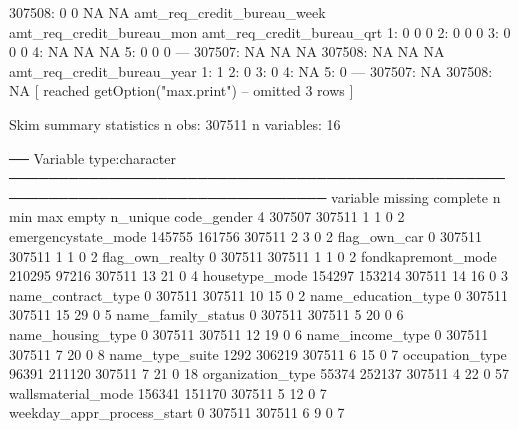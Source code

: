\documentclass[a4paper]{article}
\begin{document}
\begin{Schunk}
\begin{Soutput}
307508:                0                0                         NA                        NA
        amt_req_credit_bureau_week amt_req_credit_bureau_mon amt_req_credit_bureau_qrt
     1:                          0                         0                         0
     2:                          0                         0                         0
     3:                          0                         0                         0
     4:                         NA                        NA                        NA
     5:                          0                         0                         0
    ---                                                                               
307507:                         NA                        NA                        NA
307508:                         NA                        NA                        NA
        amt_req_credit_bureau_year
     1:                          1
     2:                          0
     3:                          0
     4:                         NA
     5:                          0
    ---                           
307507:                         NA
307508:                         NA
 [ reached getOption("max.print") -- omitted 3 rows ]
\end{Soutput}
\begin{Soutput}
Skim summary statistics
 n obs: 307511 
 n variables: 16 

── Variable type:character ──────────────────────────────────────────────────────────────────────────────────
                   variable missing complete      n min max empty n_unique
                code_gender       4   307507 307511   1   1     0        2
        emergencystate_mode  145755   161756 307511   2   3     0        2
               flag_own_car       0   307511 307511   1   1     0        2
            flag_own_realty       0   307511 307511   1   1     0        2
         fondkapremont_mode  210295    97216 307511  13  21     0        4
             housetype_mode  154297   153214 307511  14  16     0        3
         name_contract_type       0   307511 307511  10  15     0        2
        name_education_type       0   307511 307511  15  29     0        5
         name_family_status       0   307511 307511   5  20     0        6
          name_housing_type       0   307511 307511  12  19     0        6
           name_income_type       0   307511 307511   7  20     0        8
            name_type_suite    1292   306219 307511   6  15     0        7
            occupation_type   96391   211120 307511   7  21     0       18
          organization_type   55374   252137 307511   4  22     0       57
         wallsmaterial_mode  156341   151170 307511   5  12     0        7
 weekday_appr_process_start       0   307511 307511   6   9     0        7
\end{Soutput}
\end{Schunk}
\end{document}

